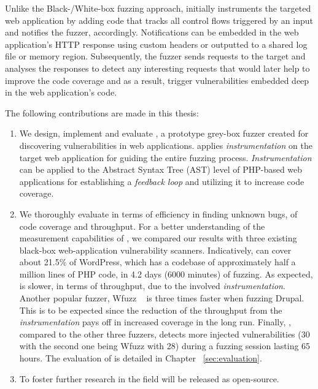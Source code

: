 Unlike the Black-/White-box fuzzing approach, \pname{} initially instruments the targeted web application by adding code that tracks all control flows triggered by an input and notifies the fuzzer, accordingly. Notifications can be embedded in the web application's HTTP response using custom headers or outputted to a shared log file or memory region. Subsequently, the fuzzer sends requests to the target and analyses the responses to detect any interesting requests that would later help to improve the code coverage and as a result, trigger vulnerabilities embedded deep in the web application's code.

The following contributions are made in this thesis:

\begin{enumerate}

\item We design, implement and evaluate \pname{}, a prototype grey-box fuzzer created for discovering vulnerabilities in web applications. \pname{} applies \emph{instrumentation} on the target web application for guiding the entire fuzzing process. \emph{Instrumentation} can be applied to the Abstract Syntax Tree (AST) level of PHP-based web applications for establishing a \emph{feedback loop} and utilizing it to increase code coverage.
\item We thoroughly evaluate \pname{} in terms of efficiency in finding unknown bugs, of code coverage and throughput. For a better understanding of the measurement capabilities of \pname{}, we compared our results with three existing black-box web-application vulnerability scanners. Indicatively, \pname{} can cover about 21.5\% of WordPress, which has a codebase of approximately half a million lines of PHP code, in 4.2 days (6000 minutes) of fuzzing. As expected, \pname{} is slower, in terms of throughput, due to the involved \emph{instrumentation}. Another popular fuzzer, Wfuzz ~\cite{wfuzz} is three times faster when fuzzing Drupal. This is to be expected since the reduction of the throughput from the \emph{instrumentation} pays off in increased coverage in the long run. Finally, \pname{}, compared to the other three fuzzers, detects more injected vulnerabilities (30 with the second one being Wfuzz with 28) during a fuzzing session lasting 65 hours. The evaluation of \pname{} is detailed in Chapter ~\ref{sec:evaluation}.
\item To foster further research in the field \pname{} will be released as open-source.

\end{enumerate}

